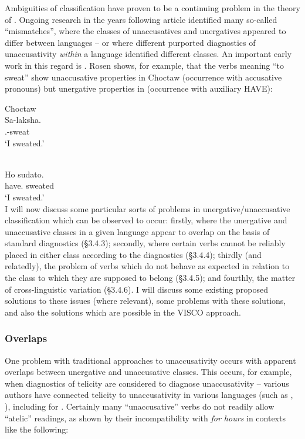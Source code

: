 \documentclass[output=paper]{langsci/langscibook}
\begin{document}
Ambiguities of classification have proven to be a continuing problem in the
theory of . Ongoing research in the years following
 article identified many so-called \enquote{mismatches},
where the classes of unaccusatives and unergatives appeared to differ between
languages – or where different purported diagnostics of unaccusativity
\emph{within} a language identified different classes. An important early
work in this regard is \citet{Rosen1984}. Rosen shows, for example, that the
verbs meaning \enquote{to sweat} show unaccusative properties in Choctaw
(occurrence with accusative pronouns) but unergative properties in 
(occurrence with auxiliary HAVE):\newpage

\ea Choctaw \parencite[62]{Rosen1984}\\
    \sn
    \gll Sa-laksha.\\
    \Fsg.\Acc-sweat\\
    \enquote*{I sweated.}\\
\z

\ea {} \parencite[62]{Rosen1984}\\
    \sn
    \gll Ho sudato.\\
    have.\Fsg{} sweated\\
    \enquote*{I sweated.}\\
\z
I will now discuss some particular sorts of problems in unergative/unaccusative
classification which can be observed to occur: firstly, where the unergative
and unaccusative classes in a given language appear to overlap on the basis of
standard diagnostics (§3.4.3); secondly, where certain verbs cannot be reliably
placed in either class according to the diagnostics (§3.4.4); thirdly (and
relatedly), the problem of verbs which do not behave as expected in relation to
the class to which they are supposed to belong (§3.4.5); and fourthly, the
matter of cross-linguistic variation (§3.4.6). I will discuss some existing
proposed solutions to these issues (where relevant), some problems with these
solutions, and also the solutions which are possible in the VISCO approach.

\subsubsection{Overlaps}

One problem with traditional approaches to unaccusativity occurs with apparent
overlaps between unergative and unaccusative classes. This occurs, for example,
when diagnostics of telicity are considered to diagnose unaccusativity –
various authors have connected telicity to unaccusativity in various languages
(such as \citealt{Zaenen1988}, \citealt{Borer2005}), including
\citet[227]{Schoorlemmer2004} for . Certainly many
\enquote{unaccusative} verbs do not readily allow \enquote{atelic} readings, as
shown by their incompatibility with \emph{for hours} in contexts like the
following:
\end{document}
